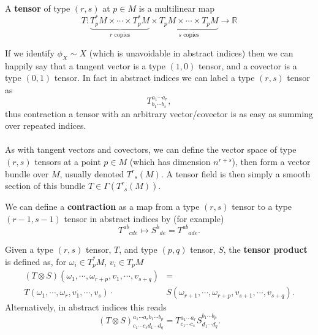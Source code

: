 \documentclass[11pt,fleqn]{report}
\begin{document}
\begin{definition}
A \textbf{tensor} of type $(r,s)$ at $p \in M$ is a multilinear map \begin{equation}
T: \underbrace{T^*_pM\times \cdots \times T_p^*M}_{r \text{ copies}} \times \underbrace{T_pM\times \cdots \times T_pM}_{s \text{ copies}} \to \mathbb{R}
\end{equation}
\end{definition}
\begin{remark}
If we identify $\phi_X \sim X$ (which is unavoidable in abstract indices) then we can happily say that a tangent vector is a type $(1,0)$ tensor, and a covector is a type $(0,1)$ tensor. In fact in abstract indices we can label a type $(r,s)$ tensor as \begin{equation}
T^{a_1 \cdots a_r}_{b_1 \cdots b_s},
\end{equation}
thus contraction a tensor with an arbitrary vector/covector is as easy as summing over repeated indices.
\end{remark}

\paragraph{}As with tangent vectors and covectors, we can define the vector space of type $(r,s)$ tensors at a point $p \in M$ (which has dimension $n^{r+s}$), then form a vector bundle over $M$, usually denoted $T^r_{\phantom r s}(M)$. A tensor field is then simply a smooth section of this bundle $T \in \Gamma\left(T^r_{\phantom r s}(M)\right)$.

\begin{definition}
We can define a \textbf{contraction} as a map from a type $(r,s)$ tensor to a type $(r-1,s-1)$ tensor in abstract indices by (for example)\begin{equation}
T^{ab}_{\phantom{ab}cde} \mapsto S^b_{\phantom a de} = T^{ab}_{\phantom{ab}ade}.
\end{equation}
\end{definition}

\begin{definition}
Given a type $(r,s)$ tensor, $T$, and type $(p,q)$ tensor, $S$, the \textbf{tensor product} is defined as, for $\omega_i \in T^*_pM$, $v_i \in T_pM$ \begin{equation}\begin{split}
\left( T \otimes S\right)(\omega_1, \cdots, \omega_{r+p},v_1,\cdots,v_{s+q}) &=\\
T(\omega_1,\cdots,\omega_r,v_1,\cdots,v_s)\cdot &S(\omega_{r+1},\cdots,\omega_{r+p},v_{s+1},\cdots,v_{s+q}).
\end{split} \end{equation}
Alternatively, in abstract indices this reads \begin{equation}
\left(T \otimes S\right)^{a_1\cdots a_r b_1 \cdots b_p}_{c_1 \cdots c_s d_1 \cdots d_q} = T^{a_1 \cdots a_r}_{c_1 \cdots c_s}S^{b_1 \cdots b_p}_{d_1 \cdots d_q}.
\end{equation}
\end{definition}
\end{document}
